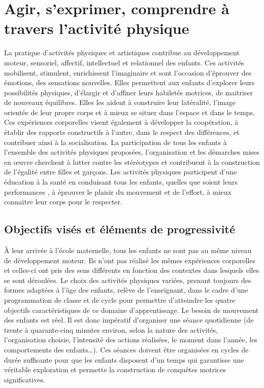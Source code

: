 \chapter{Agir, s’exprimer, comprendre à travers l’activité physique}
La pratique d’activités physiques et artistiques contribue au développement moteur, sensoriel, affectif, intellectuel et relationnel des enfants. Ces activités mobilisent, stimulent, enrichissent l’imaginaire et sont l’occasion d’éprouver des émotions, des sensations nouvelles. Elles permettent aux enfants d’explorer leurs possibilités physiques, d’élargir et d’affiner leurs habiletés motrices, de maitriser de nouveaux équilibres. Elles les aident à construire leur latéralité, l’image orientée de leur propre corps et à mieux se situer dans l’espace et dans le temps. 
Ces expériences corporelles visent également à développer la coopération, à établir des rapports constructifs à l’autre, dans le respect des différences, et contribuer ainsi à la socialisation. La participation de tous les enfants à l’ensemble des activités physiques proposées, l’organisation et les démarches mises en œuvre cherchent à lutter contre les stéréotypes et contribuent à la construction de l’égalité entre filles et garçons. Les activités physiques participent d’une éducation à la santé en conduisant tous les enfants, quelles que soient leurs \og performances \fg{}, à éprouver le plaisir du mouvement et de l’effort, à mieux connaitre leur corps pour le respecter. 

\section{Objectifs visés et éléments de progressivité}  
À leur arrivée à l’école maternelle, tous les enfants ne sont pas au même niveau de développement moteur. Ils n’ont pas réalisé les mêmes expériences corporelles et celles-ci ont pris des sens différents en fonction des contextes dans lesquels elles se sont déroulées. Le choix des activités physiques variées, prenant toujours des formes adaptées à l’âge des enfants, relève de l’enseignant, dans le cadre d’une programmation de classe et de cycle pour permettre d’atteindre les quatre objectifs caractéristiques de ce domaine d’apprentissage. Le besoin de mouvement des enfants est réel. Il est donc impératif d'organiser une séance quotidienne (de trente à quarante-cinq minutes environ, selon la nature des activités, l'organisation choisie, l'intensité des actions réalisées, le moment dans l'année, les comportements des enfants\dots). Ces séances doivent être organisées en cycles de durée suffisante pour que les enfants disposent d’un temps qui garantisse une véritable exploration et permette la construction de conquêtes motrices significatives.

